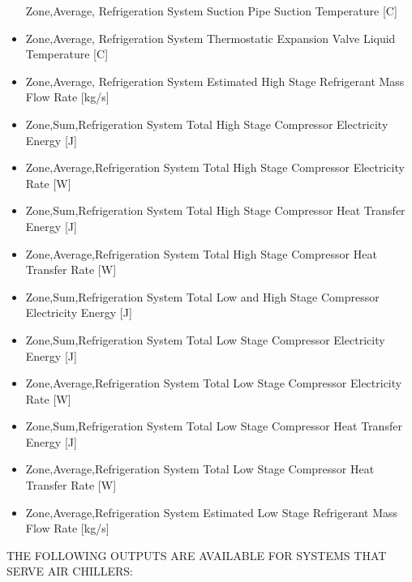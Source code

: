 \begin{itemize}
  Zone,Average, Refrigeration System Suction Pipe Suction Temperature {[}C{]}
\item
  Zone,Average, Refrigeration System Thermostatic Expansion Valve Liquid Temperature {[}C{]}
\item
  Zone,Average, Refrigeration System Estimated High Stage Refrigerant Mass Flow Rate {[}kg/s{]}
\item
  Zone,Sum,Refrigeration System Total High Stage Compressor Electricity Energy {[}J{]}
\item
  Zone,Average,Refrigeration System Total High Stage Compressor Electricity Rate {[}W{]}
\item
  Zone,Sum,Refrigeration System Total High Stage Compressor Heat Transfer Energy {[}J{]}
\item
  Zone,Average,Refrigeration System Total High Stage Compressor Heat Transfer Rate {[}W{]}
\item
  Zone,Sum,Refrigeration System Total Low and High Stage Compressor Electricity Energy {[}J{]}
\item
  Zone,Sum,Refrigeration System Total Low Stage Compressor Electricity Energy {[}J{]}
\item
  Zone,Average,Refrigeration System Total Low Stage Compressor Electricity Rate {[}W{]}
\item
  Zone,Sum,Refrigeration System Total Low Stage Compressor Heat Transfer Energy {[}J{]}
\item
  Zone,Average,Refrigeration System Total Low Stage Compressor Heat Transfer Rate {[}W{]}
\item
  Zone,Average,Refrigeration System Estimated Low Stage Refrigerant Mass Flow Rate {[}kg/s{]}
\end{itemize}

THE FOLLOWING OUTPUTS ARE AVAILABLE FOR SYSTEMS THAT SERVE AIR CHILLERS:

